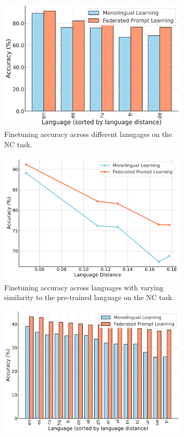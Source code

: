 \documentclass[withindex,glossary,firstyr]{cam-thesis}
\begin{document}
\begin{figure}[h]
    \centering
    \vspace{-0.3cm}%
    \begin{subfigure}{0.49\textwidth}
        \centering
        \includegraphics[width=0.8\linewidth]{nc_lang.png}
        \vspace{-0.1cm}
        \caption{Finetuning accuracy across different lanugages on the NC task. }
    \end{subfigure}
    \hfill
    \begin{subfigure}{0.49\textwidth}
        \centering
        \includegraphics[width=0.8\linewidth]{nc_distance.pdf}
        \vspace{-0.1cm}
        \caption{Finetuning accuracy across languages with varying similarity to the pre-trained language on the NC task. }
    \end{subfigure}
    \hfill
    \begin{subfigure}{0.49\textwidth}
        \centering
        \includegraphics[width=0.8\linewidth]{performance-distance-xnli.png}

\end{subfigure}
\end{figure}
\end{document}
